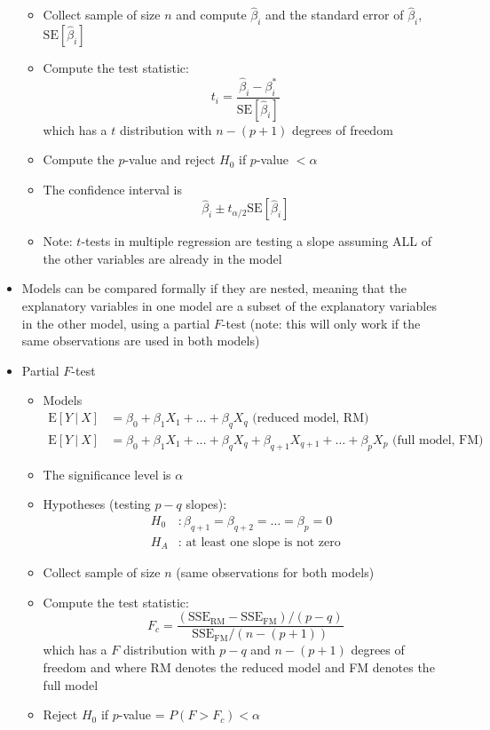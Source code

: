 \documentclass[12pt]{article}
\begin{document}
\begin{itemize}
\begin{itemize}
\item Collect sample of size $n$ and compute $\hat{\beta}_i$ and the standard error of $\hat{\beta}_i$, $\text{SE}[\hat{\beta}_i]$ 
\item Compute the test statistic: $$ t_i = \frac{\hat{\beta}_i - \beta_i^*}{\text{SE}[\hat{\beta}_i]} $$ which has a $t$ distribution with $n-(p+1)$ degrees of freedom 
\item Compute the $p$-value and reject $H_0$ if $p$-value $< \alpha$
\item The confidence interval is $$ \hat{\beta}_i \pm t_{\alpha/2} \text{SE}[\hat{\beta}_i]$$ 
\item Note: $t$-tests in multiple regression are testing a slope assuming ALL of the other variables are already in the model \end{itemize} 
\item Models can be compared formally if they are nested, meaning that the explanatory variables in one model are a subset of the explanatory variables in the other model, using a partial $F$-test (note: this will only work if the same observations are used in both models)
\item Partial $F$-test \begin{itemize} 
\item Models $$ \begin{aligned} \text{E}[Y~|~X] &= \beta_0 + \beta_1X_1 + \dots + \beta_qX_q \text{ (reduced model, RM)} \\ \text{E}[Y~|~X] &= \beta_0 + \beta_1X_1 + \dots + \beta_qX_q + \beta_{q+1}X_{q+1} + \dots + \beta_pX_p \text{ (full model, FM)} \end{aligned} $$ 
\item The significance level is $\alpha$
\item Hypotheses (testing $p-q$ slopes): $$ \begin{aligned} H_0 &: \beta_{q+1} = \beta_{q+2} = \dots = \beta_{p} = 0 \\ H_A &: \text{ at least one slope is not zero} \end{aligned} $$ 
\item Collect sample of size $n$ (same observations for both models)
\item Compute the test statistic: $$F_c = \frac{(\text{SSE}_{\text{RM}} - \text{SSE}_{\text{FM}}) / (p-q)}{\text{SSE}_{\text{FM}} / (n-(p+1))} $$ 
which has a $F$ distribution with $p-q$ and $n-(p+1)$ degrees of freedom and where RM denotes the reduced model and FM denotes the full model
\item Reject $H_0$ if $p$-value = $P(F > F_c) < \alpha$ \end{itemize} 

\end{itemize}
\end{document}
